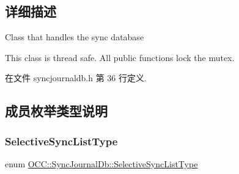 \subsection{详细描述}
Class that handles the sync database 

This class is thread safe. All public functions lock the mutex. 

在文件 syncjournaldb.\+h 第 36 行定义.



\subsection{成员枚举类型说明}
\mbox{\label{class_o_c_c_1_1_sync_journal_db_ad028daa35155c92ce2e3863602f9feeb}} 
\subsubsection{\texorpdfstring{Selective\+Sync\+List\+Type}{SelectiveSyncListType}}
{\footnotesize\ttfamily enum \hyperlink{class_o_c_c_1_1_sync_journal_db_ad028daa35155c92ce2e3863602f9feeb}{O\+C\+C\+::\+Sync\+Journal\+Db\+::\+Selective\+Sync\+List\+Type}}

